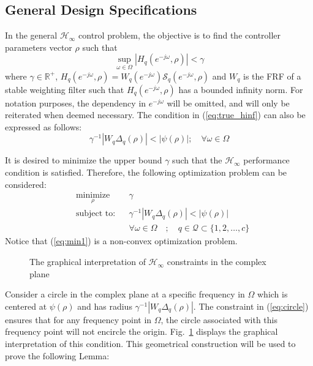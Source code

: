 \documentclass[journal]{IEEEtran}
\begin{document}
\subsection{General Design Specifications}
\label{sec:general}
In the general $\mathcal{H}_\infty$ control problem, the objective is to find the controller parameters vector $\rho$ such that
\begin{equation} \label{eq:true_hinf}
\sup_{\omega \in \Omega} |H_q(e^{-j\omega},\rho)| < \gamma
\end{equation}
where $\gamma \in \mathbb{R}^+$, $H_q(e^{-j\omega},\rho) = W_q(e^{-j\omega}) \mathcal{S}_q(e^{-j\omega},\rho)$ and $W_q$ is the FRF of a stable weighting filter such that $H_q(e^{-j\omega},\rho)$ has a bounded infinity norm. For notation purposes, the dependency in $e^{-j\omega}$ will be omitted, and will only be reiterated when deemed necessary. The condition in (\ref{eq:true_hinf}) can also be expressed as follows:
\begin{equation} \label{eq:circle}
\gamma^{-1}|W_q \Delta_q(\rho)| < |\psi(\rho)| ; \quad \forall \omega \in \Omega
\end{equation}

It is desired to minimize the upper bound $\gamma$ such that the $\mathcal{H}_{\infty}$ performance condition is satisfied. 
Therefore, the following optimization problem can be considered:
\begin{equation} \label{eq:min1}
\begin{aligned}
& \underset{\rho}{\text{minimize}}
& & \gamma  \\
& \text{subject to:} & & \gamma^{-1} |W_q\Delta_q(\rho)| < |\psi(\rho)|  \\ 
& & & \forall \omega \in \Omega \quad ; \quad  q \in \mathcal{Q} \subset \{1, 2, \ldots, c\}
\end{aligned}
\end{equation}
Notice that (\ref{eq:min1}) is a non-convex optimization problem.


\begin{figure}
\hspace*{1cm}
\resizebox{0.9\columnwidth}{!}{}
\caption{The graphical interpretation of $\mathcal{H}_{\infty}$ constraints in the complex plane}
\label{fig:circle}
\end{figure}

Consider a circle in the complex plane at a specific frequency in $\Omega$ which is centered at $\psi(\rho)$ and has radius $\gamma^{-1}|W_q\Delta_q(\rho)|$. The constraint in (\ref{eq:circle}) ensures that for any frequency point in $\Omega$, the circle associated with this frequency point will not encircle the origin. Fig.~\ref{fig:circle} displays the graphical interpretation of this condition. This geometrical construction will be used to prove the following Lemma:
\end{document}
